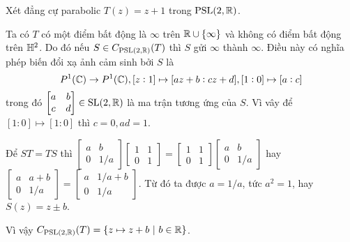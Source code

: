 \begin{exam*}
    Xét đẳng cự parabolic $T(z) = z+1$ trong $\operatorname{PSL}(2,\mathbb{R})$. 
    
    Ta có $T$ có một điểm bất động là $\infty$ trên $\mathbb{R} \cup \{\infty\}$ và không có điểm bất động trên $\mathbb{H}^2$. 
    Do đó nếu $S \in C_{\operatorname{PSL}(2,\mathbb{R})}(T)$ thì $S$ gửi $\infty$ thành $\infty$. Điều này có nghĩa phép biến đổi xạ ảnh cảm sinh bởi $S$ là \[P^1(\mathbb{C}) \to P^1(\mathbb{C}), [z:1]\mapsto [az+b:cz+d], [1:0]\mapsto [a:c]\] trong đó $\begin{bmatrix} a & b \\ c & d \\ \end{bmatrix} \in \operatorname{SL}(2,\mathbb{R})$ là ma trận tương ứng của $S$. Vì vây để $[1:0] \mapsto [1:0]$ thì $c = 0, ad = 1$.

    Để $ST = TS$ thì 
    $\begin{bmatrix}
        a & b\\
        0 & 1/a
    \end{bmatrix}
    \begin{bmatrix}
        1 & 1\\
        0 & 1
    \end{bmatrix} =
    \begin{bmatrix}
        1 & 1\\
        0 & 1
    \end{bmatrix}
    \begin{bmatrix}
        a & b\\
        0 & 1/a
        \end{bmatrix}$ hay $\begin{bmatrix}
        a & a+b\\
        0 & 1/a
    \end{bmatrix} = \begin{bmatrix}
    a & 1/a+b\\
    0 & 1/a
    \end{bmatrix}$. Từ đó ta được $a = 1/a$, tức $a^2 = 1$, hay $S(z) = z\pm b$.
    
    Vì vậy $C_{\operatorname{PSL}(2,\mathbb{R})}(T) = \{z\mapsto z+b~|~b\in \mathbb{R}\}$. 
\end{exam*}
